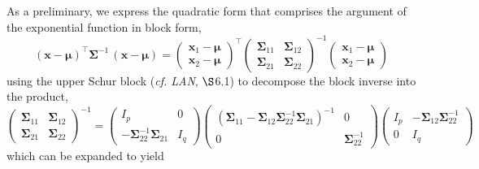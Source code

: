 \documentclass[12pt, twoside, draft]{article}
\begin{document}
As a preliminary, we express the quadratic form that comprises the argument of the exponential function in block form,
\begin{equation}
(\mathbf{x} - \boldsymbol{\mu})^\top \boldsymbol{\Sigma}^{-1} \, (\mathbf{x} - \boldsymbol{\mu}) =
\begin{pmatrix} \mathbf{x}_1 - \boldsymbol{\mu} \\ \mathbf{x}_2 -\boldsymbol{\mu}\end{pmatrix}^\top
\begin{pmatrix} \boldsymbol{\Sigma}_{11} & \boldsymbol{\Sigma}_{12} \\ \boldsymbol{\Sigma}_{21} & \boldsymbol{\Sigma}_{22} \end{pmatrix}^{-1}
\begin{pmatrix} \mathbf{x}_1 - \boldsymbol{\mu} \\ \mathbf{x}_2 - \boldsymbol{\mu} \end{pmatrix}
\end{equation}
using the upper Schur block (\textit{cf. LAN}, $\S$6.1) to decompose the block inverse into the product,
\begin{equation}
\begin{pmatrix} \boldsymbol{\Sigma}_{11} & \boldsymbol{\Sigma}_{12} \\ \boldsymbol{\Sigma}_{21} & \boldsymbol{\Sigma}_{22} \end{pmatrix}^{-1} =
\begin{pmatrix} I_p & 0 \\ -\boldsymbol{\Sigma}_{22}^{-1} \boldsymbol{\Sigma}_{21} & I_q \end{pmatrix}
\begin{pmatrix} \left( \boldsymbol{\Sigma}_{11} - \boldsymbol{\Sigma}_{12} \boldsymbol{\Sigma}_{22}^{-1} \boldsymbol{\Sigma}_{21} \right)^{-1} & 0 \\ 0 &  \boldsymbol{\Sigma}_{22}^{-1} \end{pmatrix}
\begin{pmatrix} I_p & -\boldsymbol{\Sigma}_{12} \boldsymbol{\Sigma}_{22}^{-1} \\ 0 & I_q \end{pmatrix}
\end{equation}
which can be expanded to yield
\end{document}
